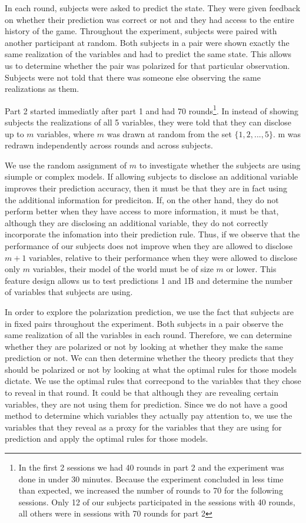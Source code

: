 \documentclass[
  12pt,
]{article}
\begin{document}
In each round, subjects were asked to predict the state. They were given
feedback on whether their prediction was correct or not and they had
access to the entire history of the game. Throughout the experiment,
subjects were paired with another participant at random. Both subjects
in a pair were shown exactly the same realization of the variables and
had to predict the same state. This allows us to determine whether the
pair was polarized for that particular observation. Subjects were not
told that there was someone else observing the same realizations as
them.

Part 2 started immediatly after part 1 and had 70
rounds\footnote{In the first 2 sessions we had 40 rounds in part 2
and the experiment was done in under 30 minutes. Because the experiment concluded in less time than expected, we increased the 
number of rounds to 70 for the following sessions. Only 12 of our subjects participated in the sessions with 40 rounds, all others 
were in sessions with 70 rounds for part 2}. In instead of showing
subjects the realizations of all 5 variables, they were told that they
can disclose up to \(m\) variables, where \(m\) was drawn at random from
the set \(\{1, 2, ..., 5\}\). m was redrawn independently across rounds
and across subjects.

We use the random assignment of \(m\) to investigate whether the
subjects are using siumple or complex models. If allowing subjects to
disclose an additional variable improves their prediction accuracy, then
it must be that they are in fact using the additional information for
prediciton. If, on the other hand, they do not perform better when they
have access to more information, it must be that, although they are
disclosing an additional variable, they do not correctly incorporate the
infomation into their prediction rule. Thus, if we observe that the
performance of our subjects does not improve when they are allowed to
disclose \(m+1\) variables, relative to their performance when they were
allowed to disclose only \(m\) variables, their model of the world must
be of size \(m\) or lower. This feature design allows us to test
predictions 1 and 1B and determine the number of variables that subjects
are using.

In order to explore the polarization prediction, we use the fact that
subjects are in fixed pairs throughout the experiment. Both subjects in
a pair observe the same realization of all the variables in each round.
Therefore, we can determine whether they are polarized or not by looking
at whether they make the same prediction or not. We can then determine
whether the theory predicts that they should be polarized or not by
looking at what the optimal rules for those models dictate. We use the
optimal rules that correcpond to the variables that they chose to reveal
in that round. It could be that although they are revealing certain
variables, they are not using them for prediction. Since we do not have
a good method to determine which variables they actually pay attention
to, we use the variables that they reveal as a proxy for the variables
that they are using for prediction and apply the optimal rules for those
models.
\end{document}
